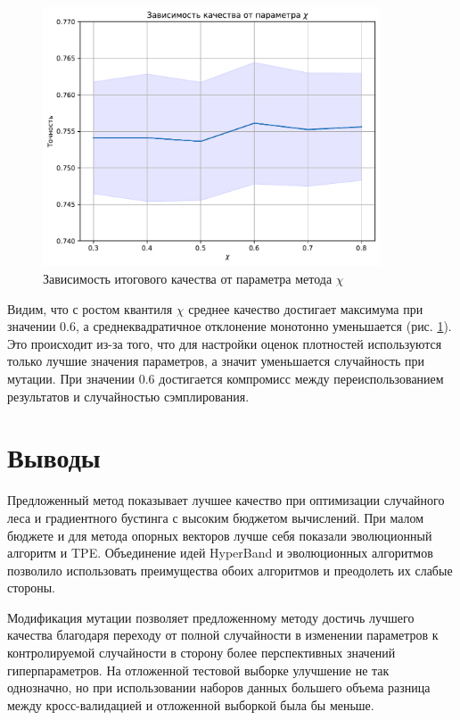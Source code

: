 \documentclass[a4paper,12pt]{article}
\begin{document}
\begin{figure}[h]
    \centering
    \includegraphics[width=10cm]{chi_ablation.pdf}
    \caption{Зависимость итогового качества от параметра метода $\chi$}
    \label{fig:chi}
\end{figure}
\par

Видим, что с ростом квантиля $\chi$ среднее качество достигает максимума при значении 0.6, а среднеквадратичное отклонение монотонно уменьшается (рис. \ref{fig:chi}). Это происходит из-за того, что для настройки оценок плотностей используются только лучшие значения параметров, а значит уменьшается случайность при мутации. При значении 0.6 достигается компромисс между переиспользованием результатов и случайностью сэмплирования.



\section{Выводы}
Предложенный метод показывает лучшее качество при оптимизации случайного леса и градиентного бустинга с высоким бюджетом вычислений. При малом бюджете и для метода опорных векторов лучше себя показали эволюционный алгоритм и TPE. Объединение идей HyperBand и эволюционных алгоритмов позволило использовать преимущества обоих алгоритмов и преодолеть их слабые стороны.

Модификация мутации позволяет предложенному методу достичь лучшего качества благодаря переходу от полной случайности в изменении параметров к контролируемой случайности в сторону более перспективных значений гиперпараметров. На отложенной тестовой выборке улучшение не так однозначно, но при использовании наборов данных большего объема разница между кросс-валидацией и отложенной выборкой была бы меньше.
\end{document}
